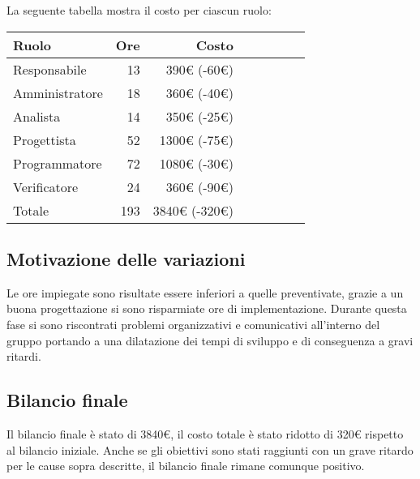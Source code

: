 La seguente tabella mostra il costo per ciascun ruolo:
\begin{table}[H]
    \begin{tabularx}{\linewidth}{X|rrrrrrr}
    \rowcolor{gray!30}Ruolo & Ore & Costo \\
    \hline
    Responsabile                            & 13    & 390€ (-60€)\\
    \rowcolor{gray!10}Amministratore        & 18    & 360€ (-40€)\\
    Analista                                & 14    & 350€ (-25€)\\
    \rowcolor{gray!10}Progettista           & 52    & 1300€ (-75€) \\
    Programmatore                           & 72    & 1080€ (-30€) \\
    \rowcolor{gray!10}Verificatore          & 24    & 360€ (-90€)\\
    \hline Totale                           & 193   & 3840€ (-320€) \\ 
    \end{tabularx}
\end{table}

\subsection{Motivazione delle variazioni}

Le ore impiegate sono risultate essere inferiori a quelle preventivate, grazie a un buona progettazione si sono risparmiate ore di implementazione. Durante questa fase si sono riscontrati problemi organizzativi e comunicativi all'interno del gruppo portando a una dilatazione dei tempi di sviluppo e di conseguenza a gravi ritardi.

\subsection{Bilancio finale}

Il bilancio finale è stato di 3840€, il costo totale è stato ridotto di 320€ rispetto al bilancio iniziale. Anche se gli obiettivi sono stati raggiunti con un grave ritardo per le cause sopra descritte, il bilancio finale rimane comunque positivo.